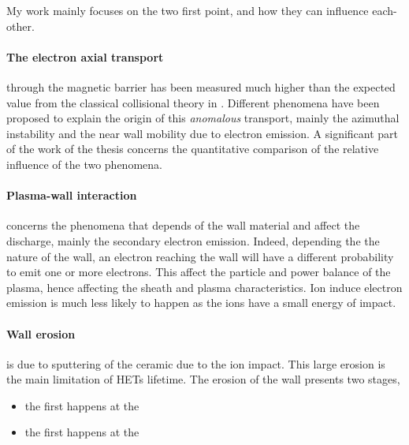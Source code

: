 My work mainly focuses on the two first point, and how they can influence each-other.

\paragraph{The electron axial transport}  through the magnetic barrier has been measured much higher than the expected value from the classical collisional theory in \citet{meezan2001}.
Different phenomena have been proposed to explain the origin of this \emph{anomalous} transport, mainly the azimuthal instability and the near wall mobility due to electron emission.
A significant part of the work of the thesis concerns the quantitative comparison of the relative influence of the two phenomena.

\paragraph{Plasma-wall interaction} concerns the phenomena that depends of the wall material and affect the discharge, mainly the secondary electron emission.
Indeed, depending the the nature of the wall, an electron reaching the wall will have a different probability to emit one or more electrons.
This affect the particle and power balance of the plasma, hence affecting the sheath and plasma characteristics.
Ion induce electron emission is much less likely to happen as the ions have a small energy of impact.

\paragraph{Wall erosion} is due to sputtering of the ceramic due to the ion impact.
This large erosion is the main limitation of \ac{HET}s lifetime.
The erosion of the wall presents two stages,
\begin{itemize}
  \item the first happens at the 
  \item the first happens at the 
\end{itemize}




